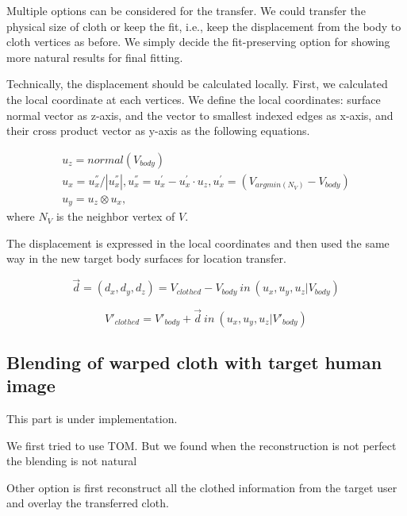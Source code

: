 Multiple options can be considered for the transfer. We could transfer the physical size of cloth or keep the fit, i.e., keep the displacement from the body to cloth vertices as before.  We simply decide the fit-preserving option for showing more natural results for final fitting.  

Technically, the displacement should be calculated locally. First, we calculated the local coordinate at each vertices. We define the local coordinates: surface normal vector as z-axis, and the vector to smallest indexed edges as x-axis, and their cross product vector as y-axis as the following equations.


\begin{align}
 u_{z} =  normal(V_{body})  \\
 u_{x} = u^{''}_{x}/ |u^{''}_{x} |, 
 u^{''}_{x} = u^{'}_{x} - u^{'}_{x} \cdot u_{z}, 
 u^{'}_{x} = (V_{argmin(N_V) } - V_{body}) \\
 u_{y}  =  u_z \otimes u_x,
\end{align} 
 where $N_V$ is the neighbor vertex of $V$.
 

The displacement is expressed in the local coordinates and then used the same way in the new target body surfaces for location transfer.

\begin{equation}
\overrightarrow{d} = (d_x, d_y, d_z) = V_{clothed} - V_{body} \: in \: (u_x, u_y, u_z | V_{body})
\end{equation}


\begin{equation}
 V'_{clothed} = V'_{body} + \overrightarrow{d} \: in \: (u_x, u_y, u_z | V'_{body})
\end{equation}



\subsection{Blending of warped cloth with target human image}


This part is under implementation.

We first tried to use TOM. But we found when the reconstruction is not perfect the blending is not natural 

Other option is first reconstruct all the clothed information from the target user and overlay the transferred cloth.






